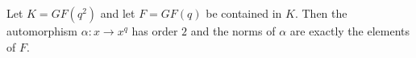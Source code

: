Let $K = GF(q^2)$ and let $F = GF(q)$ be contained in $K$. Then the automorphism $\alpha : x \rightarrow x^q$ has order $2$ and the norms of $\alpha$ are exactly the elements of $F$.
